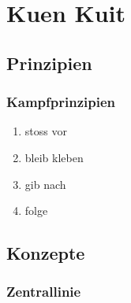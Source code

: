 
\renewcommand\chapterillustration{six-computers-chips-circuits}
\chapter{Kuen Kuit}



\section{Prinzipien}


\subsection{Kampfprinzipien}

\begin{enumerate}
	\item stoss vor
	\item bleib kleben
	\item gib nach
	\item folge
\end{enumerate}


\section{Konzepte}

\subsection{Zentrallinie}

